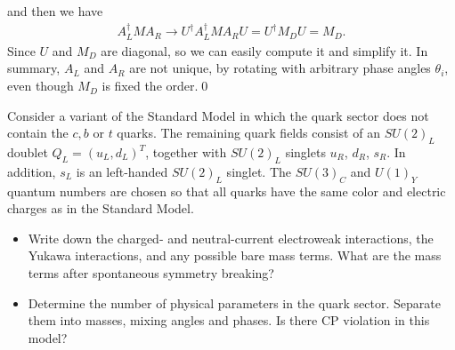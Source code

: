 and then we have 
\begin{align}
    A_L^\dagger M A_R \to U^\dagger A_L^\dagger M A_R U = U^\dagger M_D U = M_D.
\end{align}
Since $U$ and $M_D$ are diagonal, so we can easily compute it and simplify it. In summary, $A_L$ and $A_R$ are not unique, by rotating with arbitrary phase angles $\theta_i$, even though $M_D$ is fixed the order.\qed




\clearpage
{}

Consider a variant of the Standard Model in which the quark sector does not contain the $c, b$ or $t$ quarks. The remaining quark fields consist of an $SU(2)_L$ doublet $Q_L = (u_L, d_L)^T$, together with $SU(2)_L$ singlets $u_R$, $d_R$, $s_R$. In addition, $s_L$ is an left-handed $SU(2)_L$ singlet. The $SU(3)_C$ and $U(1)_Y$ quantum numbers are chosen so that all quarks have the same color and electric charges as in the Standard Model.

\begin{itemize}
    \item [(a)] Write down the charged- and neutral-current electroweak interactions, the Yukawa interactions, and any possible bare mass terms. What are the mass terms after spontaneous symmetry breaking?
    \item [(b)] Determine the number of physical parameters in the quark sector. Separate them into masses, mixing angles and phases. Is there CP violation in this model?
\end{itemize}

